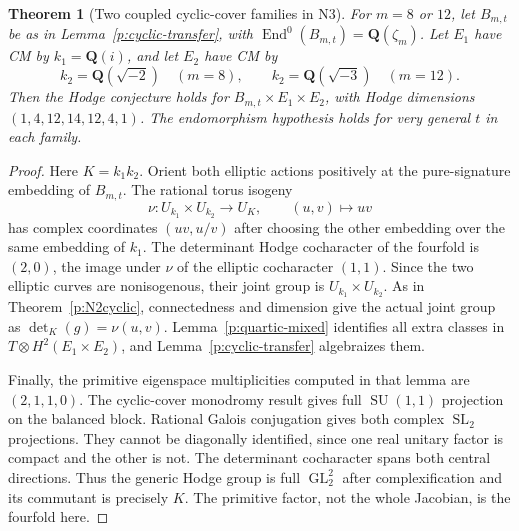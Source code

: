 \documentclass[10pt,reqno]{article}
\theoremstyle{emphasizedplain}
\newtheorem{theorem}{Theorem}[section]
\theoremstyle{emphasizeddefinition}
\theoremstyle{emphasizeddefinition}
\DeclareMathOperator{\End}{End}
\DeclareMathOperator{\GL}{GL}
\DeclareMathOperator{\SL}{SL}
\DeclareMathOperator{\SU}{SU}
\newcommand{\Q}{\mathbf Q}
\begin{document}
\begin{theorem}[Two coupled cyclic-cover families in N3]\label{p:N3cyclic}
For $m=8$ or $12$, let $B_{m,t}$ be as in
Lemma~\ref{p:cyclic-transfer}, with
$\End^0(B_{m,t})=\Q(\zeta_m)$. Let $E_1$ have CM by $k_1=\Q(i)$,
and let $E_2$ have CM by
\[
 k_2=\Q(\sqrt{-2})\quad(m=8),\qquad
 k_2=\Q(\sqrt{-3})\quad(m=12).
\]
Then the Hodge conjecture holds for $B_{m,t}\times E_1\times E_2$,
with Hodge dimensions $(1,4,12,14,12,4,1)$. The endomorphism
hypothesis holds for very general $t$ in each family.
\end{theorem}
\begin{proof}
Here $K=k_1k_2$. Orient both elliptic actions positively at the
pure-signature embedding of $B_{m,t}$. The rational torus isogeny
\[
 \nu:U_{k_1}\times U_{k_2}\longrightarrow U_K,
 \qquad (u,v)\longmapsto uv
\]
has complex coordinates $(uv,u/v)$ after choosing the other
embedding over the same embedding of $k_1$. The determinant Hodge
cocharacter of the fourfold is $(2,0)$, the image under $\nu$ of
the elliptic cocharacter $(1,1)$. Since the two elliptic curves
are nonisogenous, their joint group is $U_{k_1}\times U_{k_2}$.
As in Theorem~\ref{p:N2cyclic}, connectedness and dimension give
the actual joint group as $\det_K(g)=\nu(u,v)$.
Lemma~\ref{p:quartic-mixed} identifies all extra classes in
$T\otimes H^2(E_1\times E_2)$, and
Lemma~\ref{p:cyclic-transfer} algebraizes them.

Finally, the primitive eigenspace multiplicities computed in that
lemma are $(2,1,1,0)$. The cyclic-cover monodromy result
\cite[Proposition 4.7(i)]{MoonenCyclic} gives full $\SU(1,1)$
projection on the balanced block. Rational Galois conjugation gives
both complex $\SL_2$ projections. They cannot be diagonally
identified, since one real unitary factor is compact and the other
is not. The determinant cocharacter spans both central directions.
Thus the generic Hodge group is full $\GL_2^2$ after
complexification and its commutant is precisely $K$.
The primitive factor, not the whole Jacobian, is the fourfold here.
\end{proof}
\end{document}
